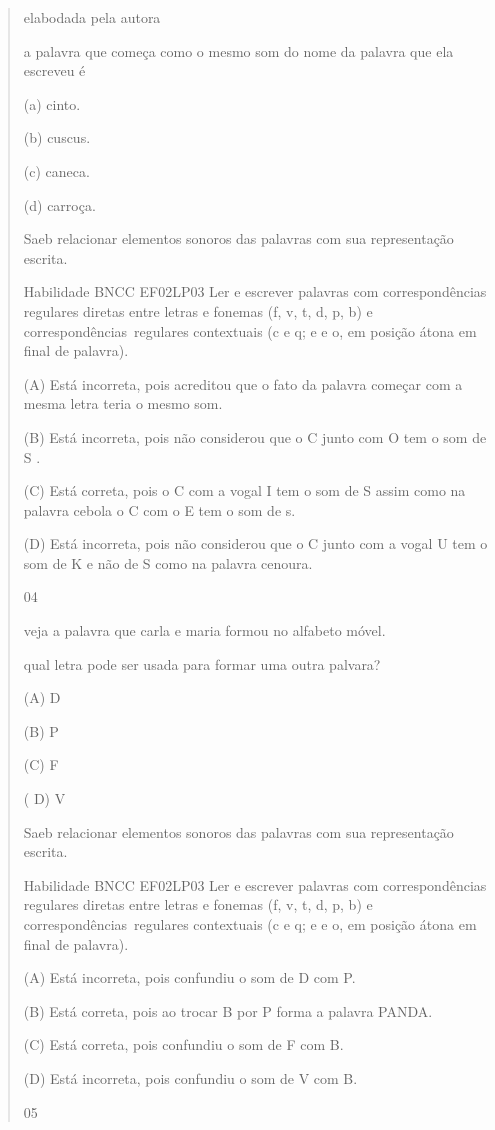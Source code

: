 {{{{\begin{verse}
{{\begin{escolha}
{{{{{elabodada pela autora

a palavra que começa como o mesmo som do nome da palavra que ela
escreveu é

(a) cinto.

(b) cuscus.

(c) caneca.

(d) carroça.

Saeb relacionar elementos sonoros das palavras com sua representação
escrita.

Habilidade BNCC EF02LP03 Ler e escrever palavras com correspondências
regulares diretas entre letras e fonemas (f, v, t, d, p, b) e
correspondências~regulares contextuais (c e q; e e o, em posição átona
em final de palavra).

(A) Está incorreta, pois acreditou que o fato da palavra começar com a
mesma letra teria o mesmo som.

(B) Está incorreta, pois não considerou que o C junto com O tem o som de
S .

(C) Está correta, pois o C com a vogal I tem o som de S assim como na
palavra cebola o C com o E tem o som de s.

(D) Está incorreta, pois não considerou que o C junto com a vogal U tem
o som de K e não de S como na palavra cenoura.

\num{04}

veja a palavra que carla e maria formou no alfabeto móvel.

qual letra pode ser usada para formar uma outra palvara?

(A) D

(B) P

(C) F

( D) V

Saeb relacionar elementos sonoros das palavras com sua representação
escrita.

Habilidade BNCC EF02LP03 Ler e escrever palavras com correspondências
regulares diretas entre letras e fonemas (f, v, t, d, p, b) e
correspondências~regulares contextuais (c e q; e e o, em posição átona
em final de palavra).

(A) Está incorreta, pois confundiu o som de D com P.

(B) Está correta, pois ao trocar B por P forma a palavra PANDA.

(C) Está correta, pois confundiu o som de F com B.

(D) Está incorreta, pois confundiu o som de V com B.

\num{05}

}}}}}
\end{escolha}}}
\end{verse}}}}}
